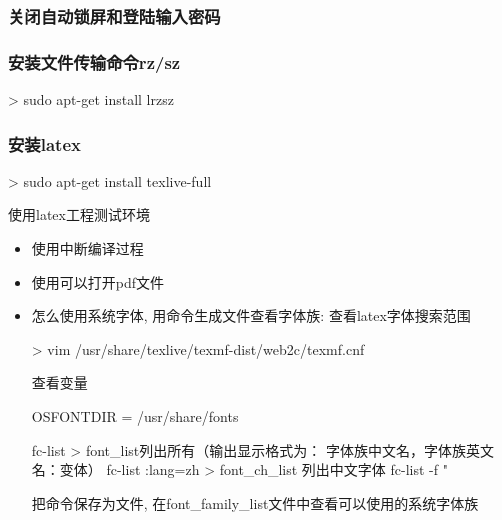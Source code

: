 \subsubsection{关闭自动锁屏和登陆输入密码}

\subsubsection{安装文件传输命令rz/sz}
\begin{commandbox}
 > sudo apt-get install lrzsz
\end{commandbox}

\subsubsection{安装latex}
\begin{commandbox}
 > sudo apt-get install texlive-full
\end{commandbox}
使用latex工程测试环境

\begin{itemize}
    \item 使用中断编译过程
    \item 使用可以打开pdf文件
    \item 怎么使用系统字体, 用命令生成文件查看字体族: 查看latex字体搜索范围
\begin{commandbox}
 > vim /usr/share/texlive/texmf-dist/web2c/texmf.cnf
\end{commandbox}

查看变量
\begin{messagebox}
OSFONTDIR = /usr/share/fonts
\end{messagebox}

\begin{commandbox}
fc-list > font_list列出所有（输出显示格式为： 字体族中文名，字体族英文名：变体）
fc-list :lang=zh > font_ch_list 列出中文字体
fc-list -f "%
\end{commandbox}
把命令保存为文件, 在font\_family\_list文件中查看可以使用的系统字体族

\end{itemize}

